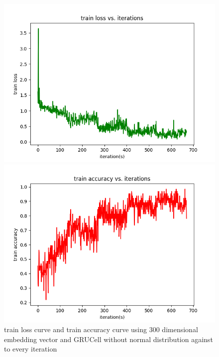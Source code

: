 \documentclass{elegantbook}
\begin{document}
\begin{figure}[!h]
	\centering
	\begin{minipage}[t]{0.48\textwidth}
		\centering
		\includegraphics[width=\textwidth]{../codes/trainlossgrucell3}
	\end{minipage}
	\begin{minipage}[t]{0.48\textwidth}
		\centering
		\includegraphics[width=\textwidth]{../codes/trainaccgrucell3}
	\end{minipage}
	\caption{\label{trainres32}train loss curve and train accuracy curve using 300 dimensional embedding vector and GRUCell without normal distribution against to every iteration}
\end{figure}
\end{document}
